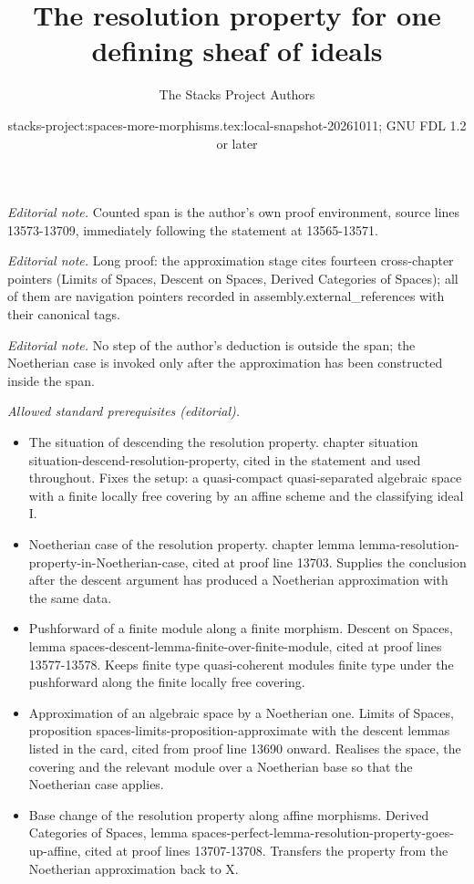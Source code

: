 \documentclass[10pt,a4paper]{amsart}
\title{The resolution property for one defining sheaf of ideals}
\author{The Stacks Project Authors}
\date{stacks-project:spaces-more-morphisms.tex:local-snapshot-20261011; GNU FDL 1.2 or later}
\theoremstyle{plain}
\theoremstyle{definition}
\theoremstyle{remark}
\numberwithin{equation}{subsection}
\begin{document}
\maketitle
\noindent\textit{Editorial note.} Counted span is the author's own proof environment, source lines 13573-13709, immediately following the statement at 13565-13571.\par\medskip
\noindent\textit{Editorial note.} Long proof: the approximation stage cites fourteen cross-chapter pointers (Limits of Spaces, Descent on Spaces, Derived Categories of Spaces); all of them are navigation pointers recorded in assembly.external\_references with their canonical tags.\par\medskip
\noindent\textit{Editorial note.} No step of the author's deduction is outside the span; the Noetherian case is invoked only after the approximation has been constructed inside the span.\par\medskip
\noindent\textit{Allowed standard prerequisites (editorial).}\begin{itemize}
\item The situation of descending the resolution property. chapter situation situation-descend-resolution-property, cited in the statement and used throughout. Fixes the setup: a quasi-compact quasi-separated algebraic space with a finite locally free covering by an affine scheme and the classifying ideal I.
\item Noetherian case of the resolution property. chapter lemma lemma-resolution-property-in-Noetherian-case, cited at proof line 13703. Supplies the conclusion after the descent argument has produced a Noetherian approximation with the same data.
\item Pushforward of a finite module along a finite morphism. Descent on Spaces, lemma spaces-descent-lemma-finite-over-finite-module, cited at proof lines 13577-13578. Keeps finite type quasi-coherent modules finite type under the pushforward along the finite locally free covering.
\item Approximation of an algebraic space by a Noetherian one. Limits of Spaces, proposition spaces-limits-proposition-approximate with the descent lemmas listed in the card, cited from proof line 13690 onward. Realises the space, the covering and the relevant module over a Noetherian base so that the Noetherian case applies.
\item Base change of the resolution property along affine morphisms. Derived Categories of Spaces, lemma spaces-perfect-lemma-resolution-property-goes-up-affine, cited at proof lines 13707-13708. Transfers the property from the Noetherian approximation back to X.
\end{itemize}\medskip
\end{document}
